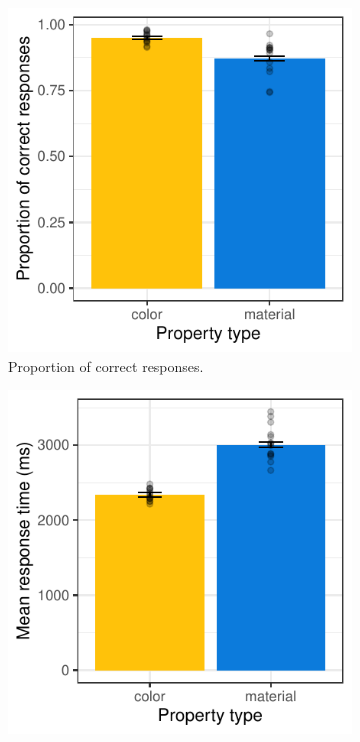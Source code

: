 \documentclass[12pt,letterpaper]{article}
\begin{document}
\begin{figure}[ht]
   \centering
   \begin{subfigure}{.4\textwidth}
   \centering
   \includegraphics[width=\textwidth]{plots/exp3_proportion.pdf}
   \caption{Proportion of correct responses.}
   \label{fig:exp3_a}
   \end{subfigure} \hspace{9mm}
   \begin{subfigure}{.4 \textwidth}
   \centering
   \includegraphics[width=\textwidth]{plots/exp3_rt.pdf}

\end{subfigure}
\end{figure}
\end{document}

